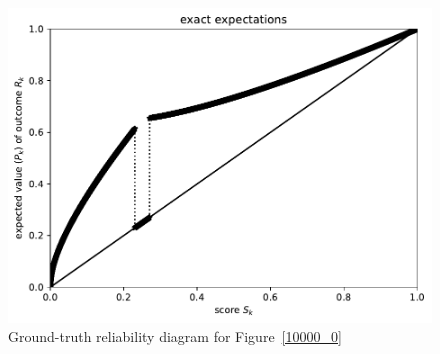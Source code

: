 \documentclass{article}
\begin{document}
\begin{figure}
\begin{centering}

\parbox{\imsize}{\includegraphics[width=\imsize]
                {./codes/unweighted/10000_10_1_2/exact.pdf}}

\end{centering}
\caption{Ground-truth reliability diagram for Figure~\ref{10000_0}}
\label{10000_0e}
\end{figure}
\end{document}
